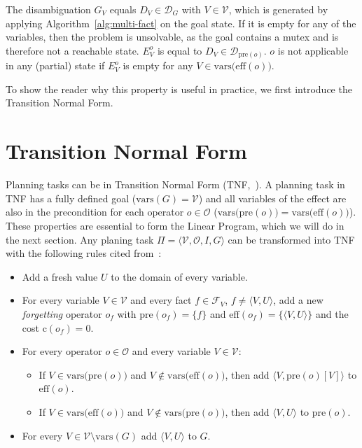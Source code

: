 The disambiguation $G_V$ equals $D_V\in\mathcal{D}_G$ with $V\in\mathcal{V}$, which is generated by applying Algorithm~\autoref{alg:multi-fact} on the goal state.
If it is empty for any of the variables, then the problem is unsolvable, as the goal contains a mutex and is therefore not a reachable state.
$E_V^o$ is equal to $D_V\in\mathcal{D}_{\text{pre}(o)}$.
$o$ is not applicable in any (partial) state if $E^o_V$ is empty for any  $V\in\text{vars(eff}(o))$.

To show the reader why this property is useful in practice, we first introduce the Transition Normal Form.

\section{Transition Normal Form}\label{sec:transition-normal-form}
Planning tasks can be in Transition Normal Form (TNF,~\citeauthor{pommerening2015normal}).
A planning task in TNF has a fully defined goal ($\text{vars}(G)=\mathcal{V}$) and all variables of the effect are also in the precondition for each operator $o\in\mathcal{O}$ ($\text{vars(pre}(o)) = \text{vars(eff}(o))$).
These properties are essential to form the Linear Program, which we will do in the next section.
Any planing task  $\Pi = \langle \mathcal{V}, \mathcal{O}, I, G \rangle$ can be transformed into TNF with the following rules cited from~\citeauthor{fivser2020strengthening}:
\begin{itemize}
    \item Add a fresh value $U$ to the domain of every variable.
    \item For every variable $V\in\mathcal{V}$ and every fact $f\in\mathcal{F}_V$, $f\neq\langle V,U\rangle$, add a new \textit{forgetting} operator $o_f$ with $\text{pre}(o_f)=\{f\}$ and $\text{eff}(o_f)=\{\langle V,U\rangle\}$ and the cost $\text{c}(o_f)=0$.
    \item For every operator $o\in\mathcal{O}$ and every variable $V\in\mathcal{V}$:
    \begin{itemize}
        \item If $V\in\text{vars(pre}(o))$ and $V\notin\text{vars(eff}(o))$, then add $\langle V,\text{pre}(o)[V]\rangle$ to $\text{eff}(o)$.
        \item If $V\in\text{vars(eff}(o))$ and $V\notin\text{vars(pre}(o))$, then add $\langle V,U\rangle$ to $\text{pre}(o)$.
    \end{itemize}
    \item For every $V\in\mathcal{V}\setminus\text{vars}(G)$ add $\langle V,U\rangle$ to $G$.
\end{itemize}

